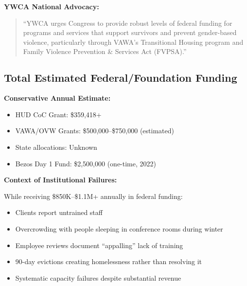 \documentclass[11pt,letterpaper]{article}
\newenvironment{testimony}{%
    \begin{quote}\itshape\color{DarkGray}%
}{%
    \end{quote}%
}
\begin{document}
\textbf{YWCA National Advocacy:}
\begin{testimony}
``YWCA urges Congress to provide robust levels of federal funding for programs and services that support survivors and prevent gender-based violence, particularly through VAWA's Transitional Housing program and Family Violence Prevention \& Services Act (FVPSA).''
\end{testimony}

\subsection{Total Estimated Federal/Foundation Funding}

\textbf{Conservative Annual Estimate:}
\begin{itemize}[leftmargin=*]
\item HUD CoC Grant: \$359,418+
\item VAWA/OVW Grants: \$500,000--\$750,000 (estimated)
\item State allocations: Unknown
\item Bezos Day 1 Fund: \$2,500,000 (one-time, 2022)
\end{itemize}

\begin{center}
\end{center}

\textbf{Context of Institutional Failures:}

While receiving \$850K--\$1.1M+ annually in federal funding:
\begin{itemize}[leftmargin=*]
\item Clients report untrained staff
\item Overcrowding with people sleeping in conference rooms during winter
\item Employee reviews document ``appalling'' lack of training
\item 90-day evictions creating homelessness rather than resolving it
\item Systematic capacity failures despite substantial revenue
\end{itemize}

\newpage
\end{document}
